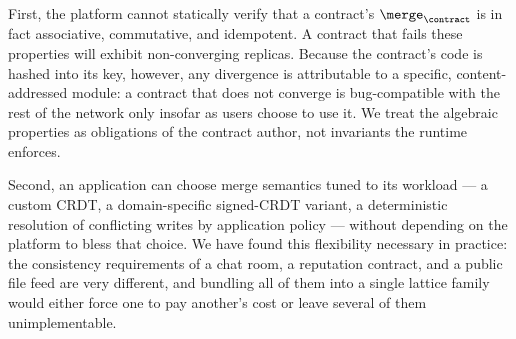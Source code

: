 First, the platform cannot statically verify that a contract's $\merge_\contract$ is in fact associative, commutative, and idempotent. A contract that fails these properties will exhibit non-converging replicas. Because the contract's code is hashed into its key, however, any divergence is attributable to a specific, content-addressed module: a contract that does not converge is bug-compatible with the rest of the network only insofar as users choose to use it. We treat the algebraic properties as obligations of the contract author, not invariants the runtime enforces.

Second, an application can choose merge semantics tuned to its workload --- a custom CRDT, a domain-specific signed-CRDT variant, a deterministic resolution of conflicting writes by application policy --- without depending on the platform to bless that choice. We have found this flexibility necessary in practice: the consistency requirements of a chat room, a reputation contract, and a public file feed are very different, and bundling all of them into a single lattice family would either force one to pay another's cost or leave several of them unimplementable.
